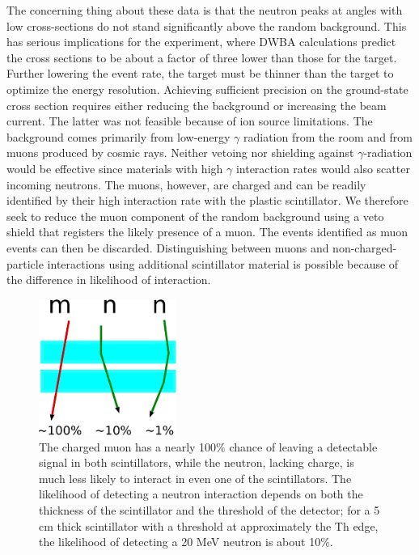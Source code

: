 The concerning thing about these data is that the neutron peaks at angles with low cross-sections do not stand significantly above the random background.  This has serious implications for the \GeTargets experiment, where DWBA calculations predict the cross sections to be about a factor of three lower than those for the  target.  Further lowering the event rate, the \GeTargets target must be thinner than the  target to optimize the energy resolution.  Achieving sufficient precision on the ground-state cross section requires either reducing the background or increasing the beam current.  The latter was not feasible because of ion source limitations.  The background comes primarily from low-energy $\gamma$ radiation from the room and from muons produced by cosmic rays.  Neither vetoing nor shielding against $\gamma$-radiation would be effective since materials with high $\gamma$ interaction rates would also scatter incoming neutrons.  The muons, however, are charged and can be readily identified by their high interaction rate with the plastic scintillator.  We therefore seek to reduce the muon component of the random background using a veto shield that registers the likely presence of a muon.  The events identified as muon events can then be discarded.  Distinguishing between muons and non-charged-particle interactions using additional scintillator material is possible because of the difference in likelihood of interaction.  
\begin{figure}[hp]
\centering
\includegraphics[width=0.4\textwidth]{figures/simpleVeto.eps}
\caption{The charged muon has a nearly 100\% chance of leaving a detectable signal in both scintillators, while the neutron, lacking charge, is much less likely to interact in even one of the scintillators.  The likelihood of detecting a neutron interaction depends on both the thickness of the scintillator and the threshold of the detector; for a 5 cm thick scintillator with a threshold at approximately the Th edge, the likelihood of detecting a 20 MeV neutron is about 10\%.}
\label{fig:simpleVeto}
\end{figure}
